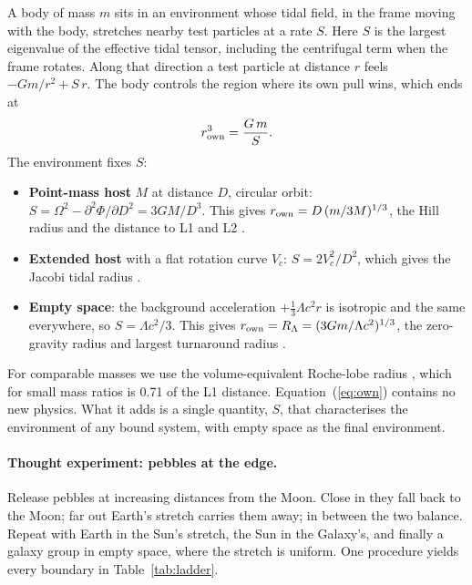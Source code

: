 \documentclass[11pt]{article}
\begin{document}
A body of mass $m$ sits in an environment whose tidal field, in the frame moving with the body, stretches nearby test particles at a rate $S$. Here $S$ is the largest eigenvalue of the effective tidal tensor, including the centrifugal term when the frame rotates. Along that direction a test particle at distance $r$ feels $-Gm/r^2+S\,r$. The body controls the region where its own pull wins, which ends at
\begin{equation}
r_{\rm own}^3=\frac{G\,m}{S}.
\label{eq:own}
\end{equation}
The environment fixes $S$:
\begin{itemize}
\item \textbf{Point-mass host} $M$ at distance $D$, circular orbit: $S=\Omega^2-\partial^2\Phi/\partial D^2=3GM/D^3$. This gives $r_{\rm own}=D\,(m/3M)^{1/3}$, the Hill radius and the distance to L1 and L2 \citep{MurrayDermott1999}.
\item \textbf{Extended host} with a flat rotation curve $V_c$: $S=2V_c^2/D^2$, which gives the Jacobi tidal radius \citep{King1962}.
\item \textbf{Empty space}: the background acceleration $+\tfrac13\Lambda c^2 r$ is isotropic and the same everywhere, so $S=\Lambda c^2/3$. This gives $r_{\rm own}=R_\Lambda=(3Gm/\Lambda c^2)^{1/3}$, the zero-gravity radius and largest turnaround radius \citep{PavlidouTomaras2014}.
\end{itemize}
For comparable masses we use the volume-equivalent Roche-lobe radius \citep{Eggleton1983}, which for small mass ratios is 0.71 of the L1 distance. Equation~(\ref{eq:own}) contains no new physics. What it adds is a single quantity, $S$, that characterises the environment of any bound system, with empty space as the final environment.

\paragraph{Thought experiment: pebbles at the edge.} Release pebbles at increasing distances from the Moon. Close in they fall back to the Moon; far out Earth's stretch carries them away; in between the two balance. Repeat with Earth in the Sun's stretch, the Sun in the Galaxy's, and finally a galaxy group in empty space, where the stretch is uniform. One procedure yields every boundary in Table~\ref{tab:ladder}.
\end{document}
